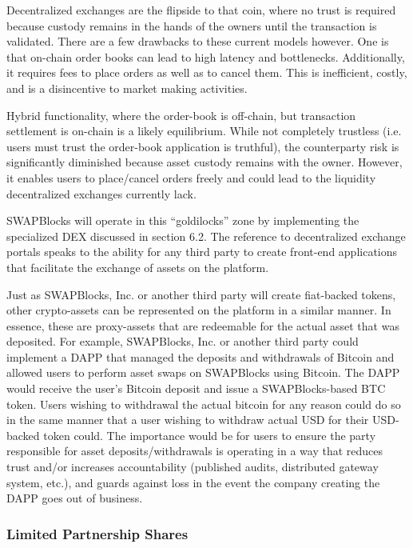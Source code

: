 \documentclass[12pt]{article}
\begin{document}
Decentralized exchanges are the flipside to that coin, where no trust is required because custody remains in 
the hands of the owners until the transaction is validated. There are a few drawbacks to these current models 
however. One is that on-chain order books can lead to high latency and bottlenecks. Additionally, it requires 
fees to place orders as well as to cancel them. This is inefficient, costly, and is a disincentive to market making activities. 

Hybrid functionality, where the order-book is off-chain, but transaction settlement is on-chain is a likely equilibrium. 
While not completely trustless (i.e. users must trust the order-book application is truthful), the counterparty risk is 
significantly diminished because asset custody remains with the owner. However, it enables users to place/cancel orders 
freely and could lead to the liquidity decentralized exchanges currently lack.

SWAPBlocks will operate in this “goldilocks” zone by implementing the specialized DEX discussed in section 6.2. The reference 
to decentralized exchange portals speaks to the ability for any third party to create front-end applications that facilitate 
the exchange of assets on the platform.

Just as SWAPBlocks, Inc. or another third party will create fiat-backed tokens, other crypto-assets can be 
represented on the platform in a similar manner. In essence, these are proxy-assets that are redeemable 
for the actual asset that was deposited. For example, SWAPBlocks, Inc. or another third party could implement a 
DAPP that managed the deposits and withdrawals of Bitcoin and allowed users to perform asset swaps on SWAPBlocks 
using Bitcoin. The DAPP would receive the user’s Bitcoin deposit and issue a SWAPBlocks-based BTC token. Users 
wishing to withdrawal the actual bitcoin for any reason could do so in the same manner that a user wishing to 
withdraw actual USD for their USD-backed token could. The importance would be for users to ensure the 
party responsible for asset deposits/withdrawals is operating in a way that reduces trust and/or increases 
accountability (published audits, distributed gateway system, etc.), and guards against loss in the event the 
company creating the DAPP goes out of business.

\subsubsection{Limited Partnership Shares}
\end{document}
